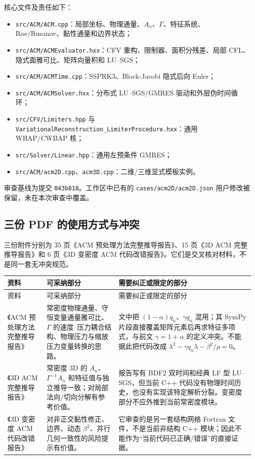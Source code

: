 \documentclass[UTF8,11pt,a4paper]{ctexart}
\newcommand{\code}[1]{\nolinkurl{#1}}
\begin{document}
核心文件及责任如下：

\begin{itemize}
  \item \code{src/ACM/ACM.cpp}：局部坐标、物理通量、$A_n$、$\Gamma$、特征系统、Roe/Rusanov、黏性通量和边界状态；
  \item \code{src/ACM/ACMEvaluator.hxx}：CFV 重构、限制器、面积分残差、局部 CFL、隐式面雅可比、矩阵向量积和 LU--SGS；
  \item \code{src/ACM/ACMTime.cpp}：SSPRK3、Block-Jacobi 隐式后向 Euler；
  \item \code{src/ACM/ACMSolver.hxx}：分布式 LU--SGS/GMRES 驱动和外层伪时间循环；
  \item \code{src/CFV/Limiters.hpp} 与 \code{VariationalReconstruction_LimiterProcedure.hxx}：通用 WBAP/CWBAP 核；
  \item \code{src/Solver/Linear.hpp}：通用左预条件 GMRES；
  \item \code{src/ACM/acm2D.cpp}、\code{acm3D.cpp}：二维/三维显式模板实例。
\end{itemize}

审查基线为提交 \code{043b818}。工作区中已有的 \code{cases/acm2D/acm2D.json} 用户修改被保留，未在本次审查中覆盖。

\subsection{三份 PDF 的使用方式与冲突}

三份附件分别为 35 页《ACM 预处理方法完整推导报告》、15 页《3D ACM 完整推导报告》和 6 页《3D 变密度 ACM 代码改错报告》。它们是交叉核对材料，不是同一套无冲突规范。

\begin{longtable}{p{}p{}p{}}
\toprule
资料 & 可采纳部分 & 需要纠正或限定的部分\\
\midrule
\endfirsthead
\toprule
资料 & 可采纳部分 & 需要纠正或限定的部分\\
\midrule
\endhead
《ACM 预处理方法完整推导报告》 & 常密度物理通量、守恒变量通量雅可比、$\Gamma$ 的速度--压力耦合结构、物理压力与缩放压力变量转换的思路。 & 文中把 $(1-\alpha)q_n$、$\gamma q_n$ 混用；其 SymPy 片段直接覆盖矩阵元素后再求特征多项式，与前文 $\gamma=1+\alpha$ 的定义冲突。不能据此把代码改成 $\lambda^2-\gamma q_n\lambda-\beta^2/\rho=0$。\\
《3D ACM 完整推导报告》 & 常密度 3D 的 $A_n$、$\Gamma^{-1}A_n$ 和特征值与独立推导一致；对局部法向/切向分解有参考价值。 & 报告写有 BDF2 双时间和经典 LF 型 LU--SGS，但当前 C++ 代码没有物理时间历史，也没有实现该特定解析分裂。变密度部分不应外推到当前常密度模块。\\
《3D 变密度 ACM 代码改错报告》 & 对非正交黏性修正、边界、动态 $\beta^2$、并行几何一致性的风险提示有价值。 & 它审查的是另一套结构网格 Fortran 文件，不是当前非结构 C++ 模块；因此不能作为“当前代码已正确/错误”的直接证据。\\
\bottomrule
\end{longtable}
\end{document}
